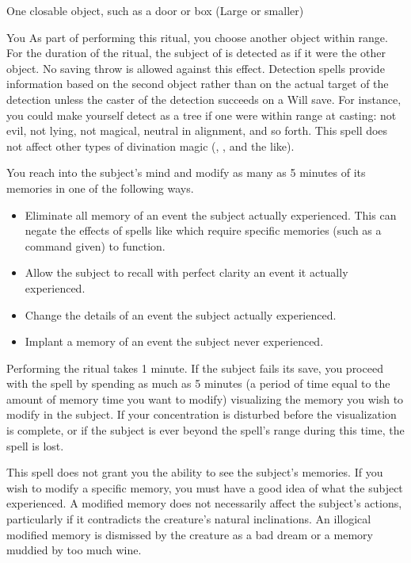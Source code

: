 \begin{spelltarget}{One closable object, such as a door or box (Large or smaller)}
\begin{spelltarget}{You}
\spelldur{\durext \dismissable}
\spelleffect As part of performing this ritual, you choose another object within range. For the duration of the ritual, the subject of  is detected as if it were the other object. No saving throw is allowed against this effect. Detection spells provide information based on the second object rather than on the actual target of the detection unless the caster of the detection succeeds on a Will save. For instance, you could make yourself detect as a tree if one were within range at casting: not evil, not lying, not magical, neutral in alignment, and so forth.
\spellnotes This spell does not affect other types of divination magic (, , and the like).

\spelleffect You reach into the subject's mind and modify as many as 5 minutes of its memories in one of the following ways.
\begin{itemize}
    \item Eliminate all memory of an event the subject actually experienced. This can negate the effects of spells like  which require specific memories (such as a command given) to function.
    \item Allow the subject to recall with perfect clarity an event it actually experienced.
    \item Change the details of an event the subject actually experienced.
    \item Implant a memory of an event the subject never experienced.
\end{itemize}
\par Performing the ritual takes 1 minute. If the subject fails its save, you proceed with the spell by spending as much as 5 minutes (a period of time equal to the amount of memory time you want to modify) visualizing the memory you wish to modify in the subject. If your concentration is disturbed before the visualization is complete, or if the subject is ever beyond the spell's range during this time, the spell is lost.
\par This spell does not grant you the ability to see the subject's memories. If you wish to modify a specific memory, you must have a good idea of what the subject experienced.
\spellnotes A modified memory does not necessarily affect the subject's actions, particularly if it contradicts the creature's natural inclinations. An illogical modified memory is dismissed by the creature as a bad dream or a memory muddied by too much wine.


\end{spelltarget}
\end{spelltarget}

